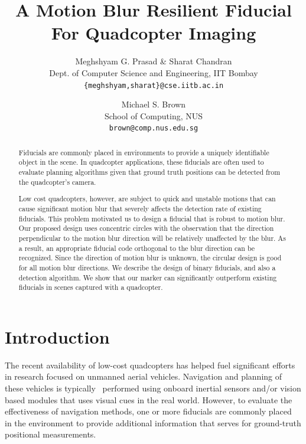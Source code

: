 \documentclass[10pt,twocolumn,letterpaper]{article}
\begin{document}
\title{A Motion Blur Resilient Fiducial For Quadcopter Imaging}

\author{Meghshyam G. Prasad  \&  Sharat Chandran\\
Dept. of Computer Science and Engineering, IIT Bombay\\
{\tt\small \{meghshyam,sharat\}@cse.iitb.ac.in}
\and
Michael S. Brown\\
School of Computing, NUS\\
{\tt\small brown@comp.nus.edu.sg}
}
\maketitle

\begin{abstract}

Fiducials are commonly placed in environments to provide a
uniquely identifiable object in the scene.  In quadcopter
applications, these fiducials are often used to evaluate planning
algorithms given that ground truth positions can be
detected from the quadcopter's camera.

Low cost quadcopters, however, are subject to quick and unstable
motions that can cause significant motion blur that severely affects
the detection rate of existing fiducials. This problem
motivated us to design a fiducial that is robust to motion blur. Our
proposed design uses concentric circles with the observation that
the direction perpendicular to the motion blur direction will be
relatively unaffected by the blur. As a result, an appropriate
fiducial code orthogonal to the blur direction can be
recognized. Since the direction of motion blur is unknown, the
circular design is good for all motion blur directions. We describe
the design of binary fiducials, and also a detection
algorithm.  We show that our marker can significantly outperform
existing fiducials in scenes captured with a quadcopter.

\end{abstract}

\section{Introduction}

The recent availability of low-cost quadcopters has helped  fuel
significant efforts in research focused on unmanned aerial
vehicles. Navigation and planning
of these vehicles is typically~\cite{Davison:2007,Engel12,Engel13}
performed using onboard inertial sensors and/or vision based modules
that uses visual cues in the real world. However, to evaluate the
effectiveness of navigation methods, one or more fiducials are commonly
placed~\cite{Bosnak:2012,Lim09,Klopschitz:2007}
 in the environment to provide additional information that
serves for ground-truth positional measurements.
\end{document}
